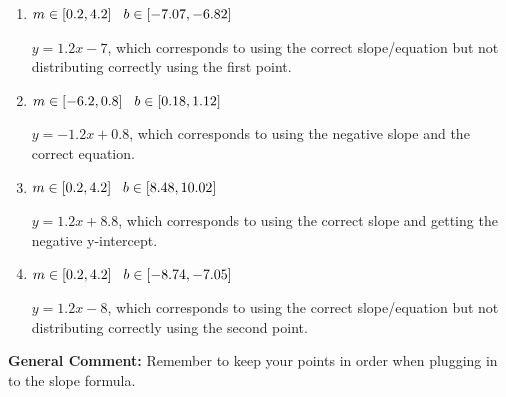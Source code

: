 \documentclass{extbook}[14pt]
\begin{document}
\begin{enumerate}
{\begin{enumerate}[label=\Alph*.]
* $y = 1.2x -8.8$, which is the correct option.
\item \( m \in [0.2, 4.2] \hspace*{3mm} b \in [-7.07, -6.82] \)

 $y = 1.2x -7$, which corresponds to using the correct slope/equation but not distributing correctly using the first point.
\item \( m \in [-6.2, 0.8] \hspace*{3mm} b \in [0.18, 1.12] \)

 $y = -1.2x + 0.8$, which corresponds to using the negative slope and the correct equation.
\item \( m \in [0.2, 4.2] \hspace*{3mm} b \in [8.48, 10.02] \)

 $y = 1.2x + 8.8$, which corresponds to using the correct slope and getting the negative y-intercept.
\item \( m \in [0.2, 4.2] \hspace*{3mm} b \in [-8.74, -7.05] \)

 $y = 1.2x -8$, which corresponds to using the correct slope/equation but not distributing correctly using the second point.
\end{enumerate}

\textbf{General Comment:} Remember to keep your points in order when plugging in to the slope formula.
}
\end{enumerate}
\end{document}
